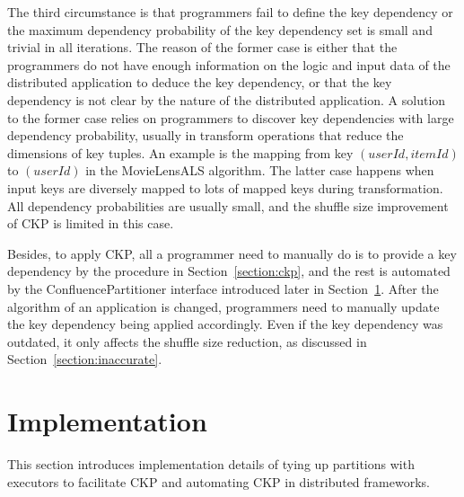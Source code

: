 \documentclass[10pt,journal,compsoc]{IEEEtran}
\begin{document}
The third circumstance is that programmers fail to define the key dependency 
or the maximum dependency probability of the key dependency set 
is small and trivial in all iterations. 
The reason of the former case is either that 
the programmers do not have enough information on the logic and input data of the distributed application to deduce the key dependency, 
or that the key dependency is not clear by the nature of the distributed application. 
A solution to the former case relies on programmers to discover 
key dependencies with large dependency probability, 
usually in transform operations that reduce the dimensions of key tuples. 
An example is the mapping from key $(userId, itemId)$ to $(userId)$ in the 
MovieLensALS algorithm.
The latter case happens when input keys are diversely mapped to lots of mapped
keys during transformation. 
All dependency probabilities are usually small, and the shuffle size improvement 
of CKP is limited in this case. 

Besides, to apply CKP, all a programmer need to manually do is to provide a key 
dependency by the procedure in Section~\ref{section:ckp}, and the rest is automated by the ConfluencePartitioner interface
introduced later in Section~\ref{section:implement}. 
After the algorithm of an application is changed, programmers need 
to manually update the key dependency being applied accordingly. 
Even if the key dependency was outdated, it only affects the shuffle size 
reduction, as discussed in Section~\ref{section:inaccurate}. 

\section{Implementation}\label{section:implement}
This section introduces implementation details of tying up partitions with executors to facilitate CKP and automating CKP in distributed frameworks.

\end{document}
